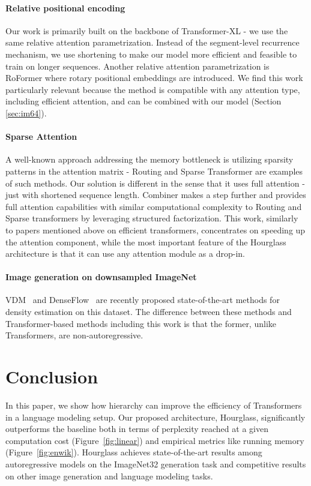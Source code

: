 \documentclass[11pt]{article}
\begin{document}
\paragraph{Relative positional encoding} Our work is primarily built on the backbone of Transformer-XL \cite{dai2019transformerxl} - we use the same relative attention parametrization. Instead of the segment-level recurrence mechanism, we use shortening to make our model more efficient and feasible to train on longer sequences. Another relative attention parametrization is RoFormer \cite{su2021roformer} where rotary positional embeddings are introduced. We find this work particularly relevant because the method is compatible with any attention type, including efficient attention, and can be combined with our model (Section \ref{sec:im64}).

\paragraph{Sparse Attention} A well-known approach addressing the memory bottleneck is utilizing sparsity patterns in the attention matrix - Routing \cite{roy2020efficient} and Sparse Transformer \cite{child2019generating} are examples of such methods. Our solution is different in the sense that it uses full attention - just with shortened sequence length. Combiner \cite{ren2021combiner} makes a step further and provides full attention capabilities with similar computational complexity to Routing and Sparse transformers by leveraging structured factorization. This work, similarly to papers mentioned above on efficient transformers, concentrates on speeding up the attention component, while the most important feature of the Hourglass architecture is that it can use any attention module as a drop-in.

\paragraph{Image generation on downsampled ImageNet} VDM~\cite{kingma2021variational} and DenseFlow~\cite{grcic2021densely}
are recently proposed state-of-the-art methods for density estimation on this dataset. The difference between these methods and Transformer-based methods \cite{parmar2018image, ho2019axial} including this work is that the former, unlike Transformers, are non-autoregressive. 

\section{Conclusion}
In this paper, we show how hierarchy can improve the efficiency of Transformers in a language modeling setup. Our proposed architecture, Hourglass, significantly outperforms the baseline both in terms of perplexity reached at a given computation cost 
(Figure~\ref{fig:linear}) and empirical metrics like running memory (Figure~\ref{fig:enwik}). Hourglass achieves state-of-the-art results among autoregressive models on the  ImageNet32 generation task and competitive results on other image generation and language modeling tasks.
\end{document}
